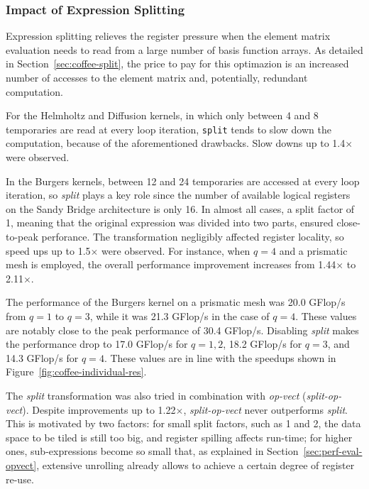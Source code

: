 
\subsubsection{Impact of Expression Splitting}
\label{sec:perf-results-split} 
Expression splitting relieves the register pressure when the element matrix evaluation needs to read from a large number of basis function arrays. As detailed in Section~\ref{sec:coffee-split}, the price to pay for this optimazion is an increased number of accesses to the element matrix and, potentially, redundant computation. 

For the Helmholtz and Diffusion kernels, in which only between 4 and 8 temporaries are read at every loop iteration, \texttt{split} tends to slow down the computation, because of the aforementioned drawbacks. Slow downs up to 1.4$\times$ were observed. 

In the Burgers kernels, between 12 and 24 temporaries are accessed at every loop iteration, so \emph{split} plays a key role since the number of available logical registers on the Sandy Bridge architecture is only 16. In almost all cases, a split factor of 1, meaning that the original expression was divided into two parts, ensured close-to-peak perforance. The transformation negligibly affected register locality, so speed ups up to 1.5$\times$ were observed. For instance, when $q=4$ and a prismatic mesh is employed, the overall performance improvement increases from 1.44$\times$ to 2.11$\times$. 

The performance of the Burgers kernel on a prismatic mesh was 20.0 GFlop/s from $q=1$ to $q=3$, while it was 21.3 GFlop/s in the case of $q=4$. These values are notably close to the peak performance of 30.4 GFlop/s. Disabling \emph{split} makes the performance drop to 17.0 GFlop/s for $q=1, 2$, 18.2 GFlop/s for $q=3$,
and 14.3 GFlop/s for $q=4$. These values are in line with the speedups shown in Figure~\ref{fig:coffee-individual-res}.

The \emph{split} transformation was also tried in combination with \emph{op-vect} (\emph{split-op-vect}). Despite improvements up to 1.22$\times$, \emph{split-op-vect} never outperforms \emph{split}. This is motivated by two factors: for small split factors, such as 1 and 2, the data space to be tiled is still too big, and register spilling affects run-time; for higher ones, sub-expressions become so small that, as explained in Section~\ref{sec:perf-eval-opvect}, extensive unrolling already allows to achieve a certain degree of register re-use.

